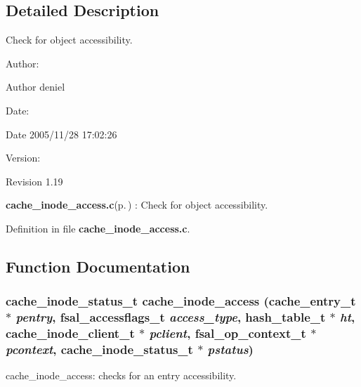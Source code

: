\subsection{Detailed Description}
Check for object accessibility. 

\begin{Desc}
\item[Author:]\begin{Desc}
\item[Author]deniel \end{Desc}
\end{Desc}
\begin{Desc}
\item[Date:]\begin{Desc}
\item[Date]2005/11/28 17:02:26 \end{Desc}
\end{Desc}
\begin{Desc}
\item[Version:]\begin{Desc}
\item[Revision]1.19 \end{Desc}
\end{Desc}
{\bf cache\_\-inode\_\-access.c}{\rm (p.\,\pageref{cache__inode__access_8c})} : Check for object accessibility.

Definition in file {\bf cache\_\-inode\_\-access.c}.

\subsection{Function Documentation}
\subsubsection{\setlength{\rightskip}{0pt plus 5cm}cache\_\-inode\_\-status\_\-t cache\_\-inode\_\-access (cache\_\-entry\_\-t $\ast$ {\em pentry}, fsal\_\-accessflags\_\-t {\em access\_\-type}, hash\_\-table\_\-t $\ast$ {\em ht}, cache\_\-inode\_\-client\_\-t $\ast$ {\em pclient}, fsal\_\-op\_\-context\_\-t $\ast$ {\em pcontext}, cache\_\-inode\_\-status\_\-t $\ast$ {\em pstatus})}\label{cache__inode__access_8c_a2}


cache\_\-inode\_\-access: checks for an entry accessibility.

